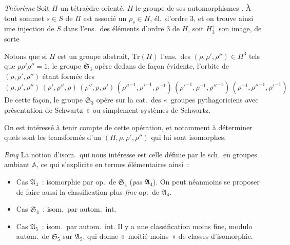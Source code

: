 \documentclass[11pt,a4paper]{article}
\begin{document}
\emph{Théorème} Soit $\Pi$ un tétraèdre  orienté, $H$ le groupe de
ses automorphismes . À tout sommet $s \in S$ de $\Pi$ est
associé un $\rho_s \in H$, él.\ d'ordre 3, et on trouve ainsi une
injection de $S$ dans l'ens.\ des  éléments
d'ordre 3 de $H$, soit $H_3^{+}$ son image, de sorte


Notons que si $H$ est un groupe abstrait, $\mathrm{Tr}(H)$ l'ens.\ des
$(\rho, \rho', \rho'') \in H^3$ tels que $\rho\rho'\rho'' = 1$, le groupe
$\mathfrak{S}_3$ opère dedans de façon évidente, l'orbite de
$(\rho, \rho', \rho'')$  étant formée des
\[
(\rho, \rho', \rho'')\,(\rho', \rho'', \rho)\,(\rho'', \rho, \rho')\,
(\rho''^{-1}, \rho'^{-1}, \rho^{-1})\,(\rho'^{-1}, \rho^{-1}, \rho''^{-1})\,
(\rho^{-1}, \rho''^{-1}, \rho'^{-1})
\]
De cette façon, le groupe $\mathfrak{S}_3$ opère sur la cat.\ des
«~groupes pythagoriciens avec présentation de Schwartz~» ou
simplement systèmes de Schwartz.

On est intéressé à tenir compte de cette opération, et notamment à
déterminer quels sont les transformés 
d'un $(H, \rho, \rho', \rho'')$ qui lui sont isomorphes.

\emph{Rmq} La notion d'isom.\ qui nous intéresse est celle définie par le
sch.\ en groupes ambiant $\mathbb{A}$, ce qui s'explicite en termes
élémentaires ainsi~:
\begin{itemize}
\item[a)] Cas $\mathfrak{A}_4$~: isomorphie par op.\ de $\mathfrak{S}_4$
 (\emph{pas} $\mathfrak{A}_4$). On peut
néanmoins se proposer de faire aussi la classification plus \emph{fine}
\ill{} op.\ de $\mathfrak{A}_4$.
\item[b)] Cas $\mathfrak{S}_4$~: isom.\ par autom.\ int.
\item[c)] Cas $\mathfrak{A}_5$~: isom.\ par autom.\ int. Il y a une
classification moins fine, modulo autom.\ de $\mathfrak{S}_5$ sur
$\mathfrak{A}_5$, qui donne «~moitié moins~» de classes d'isomorphie.
\end{itemize}
\end{document}
